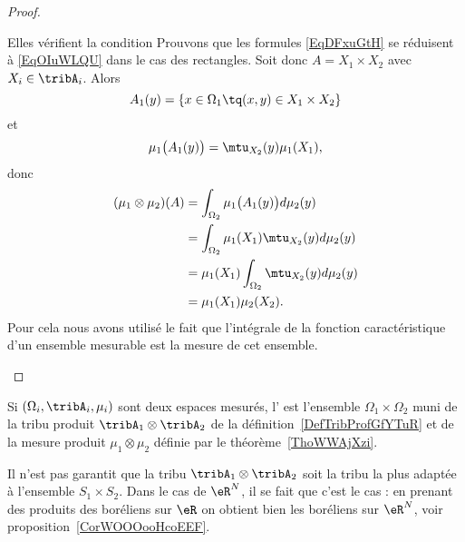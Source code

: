 \begin{proof}
\begin{subproof}
\item[Elles vérifient la condition]
    Prouvons que les formules \eqref{EqDFxuGtH} se réduisent à \eqref{EqOIuWLQU} dans le cas des rectangles. Soit donc \( A=X_1\times X_2\) avec \( X_i\in\tribA_i\). Alors
    \begin{equation}
        A_1(y)=\{ x\in\Omega_1\tq (x,y)\in X_1\times X_2 \}
    \end{equation}
    et
    \begin{equation}
        \mu_1\big( A_1(y) \big)=\mtu_{X_2}(y)\mu_1(X_1),
    \end{equation}
    donc
    \begin{subequations}
        \begin{align}
            (\mu_1\otimes\mu_2)(A)&=\int_{\Omega_2}\mu_1\big( A_1(y) \big)d\mu_2(y)\\
            &=\int_{\Omega_2}\mu_1(X_1)\mtu_{X_2}(y)d\mu_2(y)\\
            &=\mu_1(X_1)\int_{\Omega_2}\mtu_{X_2}(y)d\mu_2(y)\\
            &=\mu_1(X_1)\mu_2(X_2).
        \end{align}
    \end{subequations}
    Pour cela nous avons utilisé le fait que l'intégrale de la fonction caractéristique d'un ensemble mesurable est la mesure de cet ensemble.
    \end{subproof}
\end{proof}

\begin{definition}  \label{DefUMlBCAO}
    Si \( (\Omega_i,\tribA_i,\mu_i)\) sont deux espaces mesurés, l' est l'ensemble \( \Omega_1\times \Omega_2\) muni de la tribu produit \( \tribA_1\otimes \tribA_2\) de la définition~\ref{DefTribProfGfYTuR} et de la mesure produit \( \mu_1\otimes \mu_2\) définie par le théorème~\ref{ThoWWAjXzi}.
\end{definition}

\begin{remark}
    Il n'est pas garantit que la tribu \( \tribA_1\otimes\tribA_2\) soit la tribu la plus adaptée à l'ensemble \( S_1\times S_2\). Dans le cas de \( \eR^N\), il se fait que c'est le cas : en prenant des produits des boréliens sur \( \eR\) on obtient bien les boréliens sur \( \eR^N\), voir proposition~\ref{CorWOOOooHcoEEF}.
\end{remark}
